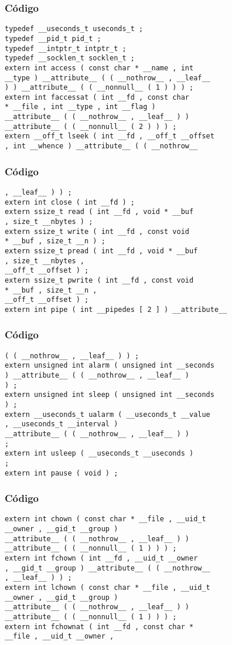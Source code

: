 \documentclass{beamer}
\begin{document}
\begin{frame}[fragile]
\frametitle{C\'odigo}
\begin{verbatim}
typedef __useconds_t useconds_t ; 
typedef __pid_t pid_t ; 
typedef __intptr_t intptr_t ; 
typedef __socklen_t socklen_t ; 
extern int access ( const char * __name , int 
__type ) __attribute__ ( ( __nothrow__ , __leaf__ 
) ) __attribute__ ( ( __nonnull__ ( 1 ) ) ) ; 
extern int faccessat ( int __fd , const char 
* __file , int __type , int __flag ) 
__attribute__ ( ( __nothrow__ , __leaf__ ) ) 
__attribute__ ( ( __nonnull__ ( 2 ) ) ) ; 
extern __off_t lseek ( int __fd , __off_t __offset 
, int __whence ) __attribute__ ( ( __nothrow__ 
\end{verbatim}
\end{frame}
\begin{frame}[fragile]
\frametitle{C\'odigo}
\begin{verbatim}
, __leaf__ ) ) ; 
extern int close ( int __fd ) ; 
extern ssize_t read ( int __fd , void * __buf 
, size_t __nbytes ) ; 
extern ssize_t write ( int __fd , const void 
* __buf , size_t __n ) ; 
extern ssize_t pread ( int __fd , void * __buf 
, size_t __nbytes , 
__off_t __offset ) ; 
extern ssize_t pwrite ( int __fd , const void 
* __buf , size_t __n , 
__off_t __offset ) ; 
extern int pipe ( int __pipedes [ 2 ] ) __attribute__ 
\end{verbatim}
\end{frame}
\begin{frame}[fragile]
\frametitle{C\'odigo}
\begin{verbatim}
( ( __nothrow__ , __leaf__ ) ) ; 
extern unsigned int alarm ( unsigned int __seconds 
) __attribute__ ( ( __nothrow__ , __leaf__ ) 
) ; 
extern unsigned int sleep ( unsigned int __seconds 
) ; 
extern __useconds_t ualarm ( __useconds_t __value 
, __useconds_t __interval ) 
__attribute__ ( ( __nothrow__ , __leaf__ ) ) 
; 
extern int usleep ( __useconds_t __useconds ) 
; 
extern int pause ( void ) ; 
\end{verbatim}
\end{frame}
\begin{frame}[fragile]
\frametitle{C\'odigo}
\begin{verbatim}
extern int chown ( const char * __file , __uid_t 
__owner , __gid_t __group ) 
__attribute__ ( ( __nothrow__ , __leaf__ ) ) 
__attribute__ ( ( __nonnull__ ( 1 ) ) ) ; 
extern int fchown ( int __fd , __uid_t __owner 
, __gid_t __group ) __attribute__ ( ( __nothrow__ 
, __leaf__ ) ) ; 
extern int lchown ( const char * __file , __uid_t 
__owner , __gid_t __group ) 
__attribute__ ( ( __nothrow__ , __leaf__ ) ) 
__attribute__ ( ( __nonnull__ ( 1 ) ) ) ; 
extern int fchownat ( int __fd , const char * 
__file , __uid_t __owner , 
\end{verbatim}
\end{frame}
\end{document}
